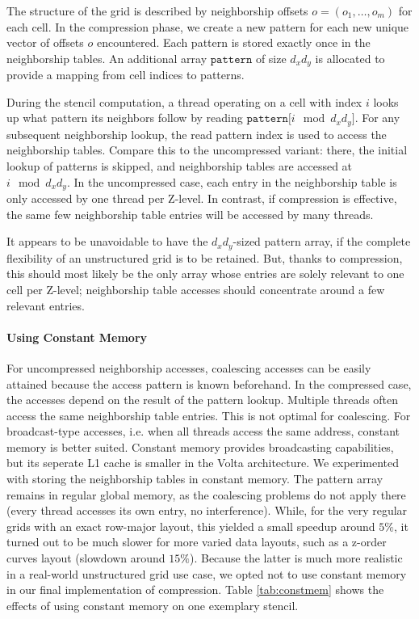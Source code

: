 The structure of the grid is described by neighborship offsets $o = (o_1, \dots, o_m)$ for each cell. In the compression phase, we create a new pattern for each new unique vector of offsets $o$ encountered. Each pattern is stored exactly once in the neighborship tables. An additional array $\mathtt{pattern}$ of size $d_xd_y$ is allocated to provide a mapping from cell indices to patterns.

During the stencil computation, a thread operating on a cell with index $i$ looks up what pattern its neighbors follow by reading $\mathtt{pattern[}i \mod d_xd_y\mathtt{]}$. For any subsequent neighborship lookup, the read pattern index is used to access the neighborship tables. Compare this to the uncompressed variant: there, the initial lookup of patterns is skipped, and neighborship tables are accessed at $i\mod d_xd_y$. In the uncompressed case, each entry in the neighborship table is only accessed by one thread per Z-level. In contrast, if compression is effective, the same few neighborship table entries will be accessed by many threads.

It appears to be unavoidable to have the $d_xd_y$-sized pattern array, if the complete flexibility of an unstructured grid is to be retained. But, thanks to compression, this should most likely be the only array whose entries are solely relevant to one cell per Z-level; neighborship table accesses should concentrate around a few relevant entries.

\paragraph{Using Constant Memory} For uncompressed neighborship accesses, coalescing accesses can be easily attained because the access pattern is known beforehand. In the compressed case, the accesses depend on the result of the pattern lookup. Multiple threads often access the same neighborship table entries. This is not optimal for coalescing. For broadcast-type accesses, i.e. when all threads access the same address, constant memory is better suited. Constant memory provides broadcasting capabilities, but its seperate L1 cache is smaller in the Volta architecture. We experimented with storing the neighborship tables in constant memory. The pattern array remains in regular global memory, as the coalescing problems do not apply there (every thread accesses its own entry, no interference). While, for the very regular grids with an exact row-major layout, this yielded a small speedup around $5\%$, it turned out to be much slower for more varied data layouts, such as a z-order curves layout (slowdown around $15\%$). Because the latter is much more realistic in a real-world unstructured grid use case, we opted not to use constant memory in our final implementation of compression. Table \ref{tab:constmem} shows the effects of using constant memory on one exemplary stencil.

